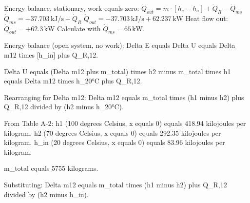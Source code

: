 Energy balance, stationary, work equals zero:  
\( \dot{Q}_{out} = \dot{m} \cdot [h_e - h_a] + \dot{Q}_R - \dot{Q}_{ms} \)  
\( \dot{Q}_{ms} = -37.703 \, \text{kJ/s} + \dot{Q}_R \)  
\( \dot{Q}_{out} = -37.703 \, \text{kJ/s} + 62.237 \, \text{kW} \)  
Heat flow out: \( \dot{Q}_{out} = +62.3 \, \text{kW} \)  
Calculate with \( \dot{Q}_{ms} = 65 \, \text{kW} \).

Energy balance (open system, no work):  
Delta E equals Delta U equals Delta m12 times [h_in] plus Q_R,12.  

Delta U equals (Delta m12 plus m_total) times h2 minus m_total times h1 equals Delta m12 times h_20°C plus Q_R,12.  

Rearranging for Delta m12:  
Delta m12 equals m_total times (h1 minus h2) plus Q_R,12 divided by (h2 minus h_20°C).  

From Table A-2:  
h1 (100 degrees Celsius, x equals 0) equals 418.94 kilojoules per kilogram.  
h2 (70 degrees Celsius, x equals 0) equals 292.35 kilojoules per kilogram.  
h_in (20 degrees Celsius, x equals 0) equals 83.96 kilojoules per kilogram.  

m_total equals 5755 kilograms.  

Substituting:  
Delta m12 equals m_total times (h1 minus h2) plus Q_R,12 divided by (h2 minus h_in).